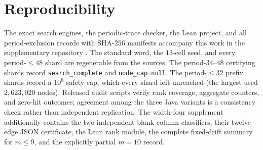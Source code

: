 \documentclass[11pt,reqno]{amsart}
\theoremstyle{plain}
\theoremstyle{definition}
\begin{document}
\section*{Reproducibility}
The exact search engines, the periodic-trace checker, the Lean project, and all
period-exclusion records with SHA-256 manifests accompany this work in the
supplementary repository \cite{Repo}. The standard word,
the $13$-cell seed, and every period-$\le48$ shard are regenerable from the
sources. The period-$34$--$48$ certifying shards record
\texttt{search\_complete} and \texttt{node\_cap=null}. The period-$\le32$
prefix shards record a $10^8$ safety cap, which every shard left unreached (the
largest used $2{,}623{,}020$ nodes). Released audit scripts verify rank coverage,
aggregate counters, and zero-hit outcomes; agreement among the three Java
variants is a consistency check rather than independent replication.
The width-four supplement additionally contains the two independent blank-column
classifiers, their twelve-edge JSON certificate, the Lean rank module, the complete
fixed-drift summary for $m\le9$, and the explicitly partial $m=10$ record.
\end{document}
